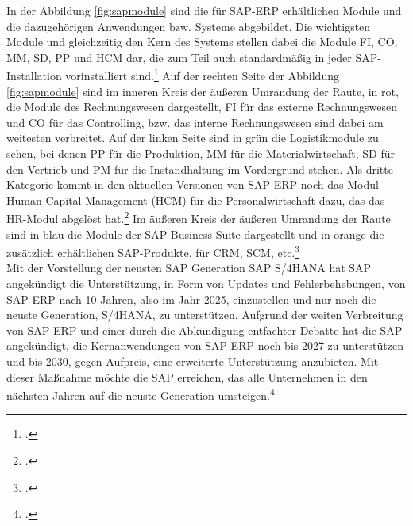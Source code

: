 In der Abbildung \ref{fig:sapmodule} sind die für SAP-ERP erhältlichen Module und die dazugehörigen Anwendungen bzw. Systeme abgebildet. Die wichtigsten Module und gleichzeitig den Kern des Systems stellen dabei die Module FI, CO, MM, SD, PP und HCM dar, die zum Teil auch standardmäßig in jeder SAP-Installation vorinstalliert sind.\footcite[Vgl.][S. 8]{sap-für-wp} Auf der rechten Seite der Abbildung \ref{fig:sapmodule} sind im inneren Kreis der äußeren Umrandung der Raute, in rot, die Module des Rechnungswesen dargestellt, FI für das externe Rechnungswesen und CO für das Controlling, bzw. das interne Rechnungswesen sind dabei am weitesten verbreitet. Auf der linken Seite sind in grün die Logistikmodule zu sehen, bei denen PP für die Produktion, MM für die Materialwirtschaft, SD für den Vertrieb und PM für die Instandhaltung im Vordergrund stehen. Als dritte Kategorie kommt in den aktuellen Versionen von SAP ERP noch das Modul Human Capital Management (HCM) für die Personalwirtschaft dazu, das das HR-Modul abgelöst hat.\footcite[Vgl.][]{sap-module2} Im äußeren Kreis der äußeren Umrandung der Raute sind in blau die Module der SAP Business Suite dargestellt und in orange die zusätzlich erhältlichen SAP-Produkte, für CRM, SCM, etc.\footcite[Vgl.][]{sap-module}
\\Mit der Vorstellung der neusten SAP Generation \glqq{}SAP S/4HANA\grqq{} hat SAP angekündigt die Unterstützung, in Form von Updates und Fehlerbehebungen, von SAP-ERP nach 10 Jahren, also im Jahr 2025, einzustellen und nur noch die neuste Generation, S/4HANA, zu unterstützen. Aufgrund der weiten Verbreitung von SAP-ERP und einer durch die Abkündigung entfachter Debatte hat die SAP angekündigt, die Kernanwendungen von SAP-ERP noch bis 2027 zu unterstützen und bis 2030, gegen Aufpreis, eine erweiterte Unterstützung anzubieten. Mit dieser Maßnahme möchte die SAP erreichen, das alle Unternehmen in den nächsten Jahren auf die neuste Generation umsteigen.\footcite[Vgl.][]{sap-support}

